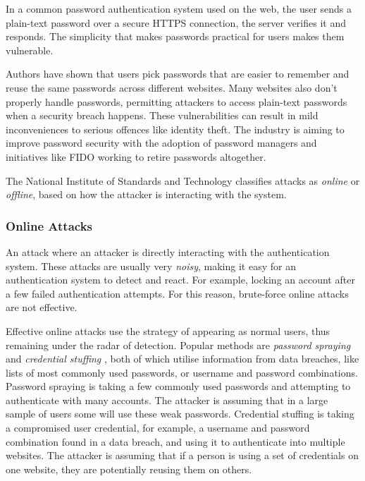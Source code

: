 In a common password authentication system used on the web, the user sends a plain-text password over a secure HTTPS connection, the server verifies it and responds.
The simplicity that makes passwords practical for users makes them vulnerable.

Authors \cite{conklin2004password} have shown that users pick passwords that are easier to remember and reuse the same passwords across different websites.
Many websites also don't properly handle passwords, permitting attackers to access plain-text passwords when a security breach happens.
These vulnerabilities can result in mild inconveniences to serious offences like identity theft.
The industry is aiming to improve password security with the adoption of password managers and initiatives like FIDO \cite{cho2014passwordless} working to retire passwords altogether.

The National Institute of Standards and Technology \cite{grassi2017} classifies attacks as \textit{online} or \textit{offline}, based on how the attacker is interacting with the system.

\subsubsection{Online Attacks}
An attack where an attacker is directly interacting with the authentication system.
These attacks are usually very \textit{noisy}, making it easy for an authentication system to detect and react.
For example, locking an account after a few failed authentication attempts.
For this reason, brute-force online attacks are not effective.

Effective online attacks use the strategy of appearing as normal users, thus remaining under the radar of detection.
Popular methods are \textit{password spraying} and \textit{credential stuffing} \cite{haber2020attack}, both of which utilise information from data breaches, like lists of most commonly used passwords, or username and password combinations.
Password spraying is taking a few commonly used passwords and attempting to authenticate with many accounts. The attacker is assuming that in a large sample of users some will use these weak passwords.
Credential stuffing is taking a compromised user credential, for example, a username and password combination found in a data breach, and using it to authenticate into multiple websites.
The attacker is assuming that if a person is using a set of credentials on one website, they are potentially reusing them on others.

